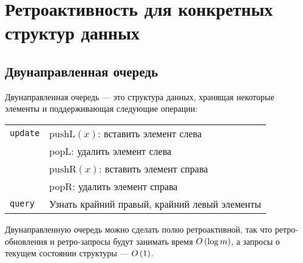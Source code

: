 \section{Ретроактивность для конкретных структур данных}
\subsection{Двунаправленная очередь}

Двунаправленная очередь — это структура данных, хранящая некоторые элементы и поддерживающая следующие операции:

\begin{center} \begin{tabular}{ll}
	{\tt update} & $\text{pushL} (x)$: вставить элемент слева \\
		& popL: удалить элемент слева \\
		& $\text{pushR} (x)$: вставить элемент справа \\
		& popR: удалить элемент справа \\
	{\tt query} & Узнать крайний правый, крайний левый элементы
\end{tabular} \end{center}

\begin{theorem} 
	Двунаправленную очередь можно сделать полно ретроактивной, так что ретро-обновления и ретро-запросы будут занимать время $O \left( \log m \right)$, а запросы о текущем состоянии структуры — $O \left( 1 \right)$.
\end{theorem}

